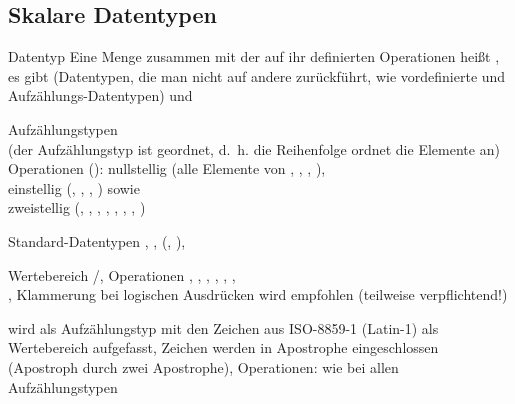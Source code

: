 \subsection{%
    Skalare Datentypen%
}

\begin{Def}{Datentyp}
    Eine Menge zusammen mit der auf ihr definierten Operationen heißt
    , es gibt  (Datentypen, die man nicht
    auf andere zurückführt, wie vordefinierte und Aufzählungs-Datentypen) und
\end{Def}

\begin{Def}{Aufzählungstypen}
     \\
    (der Aufzählungstyp ist geordnet, d.~h. die Reihenfolge ordnet die Elemente
    an) \\
    Operationen (): nullstellig (alle Elemente von
    , , , ), \\
    einstellig (, ,
    , ) sowie \\
    zweistellig (\adacode{=}, \adacode{/=}, \adacode{<}, \adacode{<=},
    \adacode{>}, \adacode{>=}, , )
\end{Def}

\begin{Def}{Standard-Datentypen}
    ,
    ,
     (, ),
\end{Def}

\begin{Def}{}
    Wertebereich /,
    Operationen , , , ,
    \adacode{=}, ,\\
    ,
    Klammerung bei logischen Ausdrücken wird empfohlen
    (teilweise verpflichtend!)
\end{Def}

\begin{Def}{}
    wird als Aufzählungstyp mit den Zeichen aus ISO-8859-1 (Latin-1)
    als Wertebereich aufgefasst, Zeichen werden in Apostrophe eingeschlossen
    (Apostroph durch zwei Apostrophe),
    Operationen: wie bei allen Aufzählungstypen
\end{Def}

